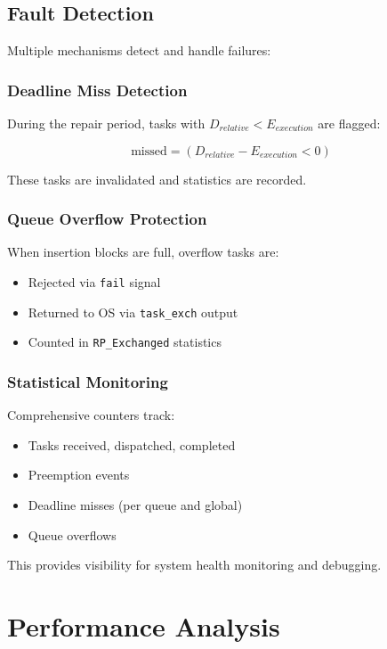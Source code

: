 \documentclass[12pt,a4paper]{article}
\begin{document}
\subsection{Fault Detection}

Multiple mechanisms detect and handle failures:

\subsubsection{Deadline Miss Detection}

During the repair period, tasks with $D_{relative} < E_{execution}$ are flagged:

\begin{equation}
\text{missed} = (D_{relative} - E_{execution} < 0)
\end{equation}

These tasks are invalidated and statistics are recorded.

\subsubsection{Queue Overflow Protection}

When insertion blocks are full, overflow tasks are:
\begin{itemize}
    \item Rejected via \texttt{fail} signal
    \item Returned to OS via \texttt{task\_exch} output
    \item Counted in \texttt{RP\_Exchanged} statistics
\end{itemize}

\subsubsection{Statistical Monitoring}

Comprehensive counters track:
\begin{itemize}
    \item Tasks received, dispatched, completed
    \item Preemption events
    \item Deadline misses (per queue and global)
    \item Queue overflows
\end{itemize}

This provides visibility for system health monitoring and debugging.

\section{Performance Analysis}
\end{document}
